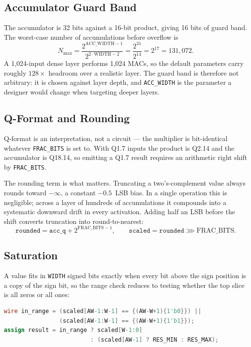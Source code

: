 \documentclass[letterpaper,12pt]{article}
\begin{document}
\subsection{Accumulator Guard Band}

The accumulator is 32 bits against a 16-bit product, giving 16 bits of guard
band. The worst-case number of accumulations before overflow is
\[
N_{\max} = \frac{2^{\text{ACC\_WIDTH}-1}}{2^{2\cdot\text{WIDTH}-2}}
        = \frac{2^{31}}{2^{14}} = 2^{17} = 131{,}072 .
\]
A 1{,}024-input dense layer performs 1{,}024 MACs, so the default parameters
carry roughly $128\times$ headroom over a realistic layer. The guard band is
therefore not arbitrary: it is chosen against layer depth, and
\texttt{ACC\_WIDTH} is the parameter a designer would change when targeting
deeper layers.

\subsection{Q-Format and Rounding}

Q-format is an interpretation, not a circuit --- the multiplier is
bit-identical whatever \texttt{FRAC\_BITS} is set to. With Q1.7 inputs the
product is Q2.14 and the accumulator is Q18.14, so emitting a Q1.7 result
requires an arithmetic right shift by \texttt{FRAC\_BITS}.

The rounding term is what matters. Truncating a two's-complement value always
rounds toward $-\infty$, a constant $-0.5$~LSB bias. In a single operation this
is negligible; across a layer of hundreds of accumulations it compounds into a
systematic downward drift in every activation. Adding half an LSB before the
shift converts truncation into round-to-nearest:
\[
\texttt{rounded} = \texttt{acc\_q} + 2^{\text{FRAC\_BITS}-1}, \qquad
\texttt{scaled}  = \texttt{rounded} \ggg \text{FRAC\_BITS}.
\]

\subsection{Saturation}

A value fits in \texttt{WIDTH} signed bits exactly when every bit above the
sign position is a copy of the sign bit, so the range check reduces to testing
whether the top slice is all zeros or all ones:

\begin{lstlisting}[language=Verilog]
wire in_range = (scaled[AW-1:W-1] == {(AW-W+1){1'b0}}) ||
                (scaled[AW-1:W-1] == {(AW-W+1){1'b1}});
assign result = in_range ? scaled[W-1:0]
                         : (scaled[AW-1] ? RES_MIN : RES_MAX);
\end{lstlisting}
\end{document}
